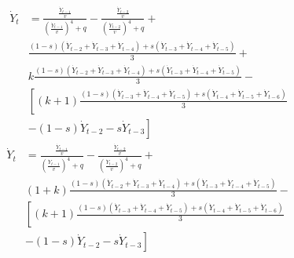 \begin{equation*}
\begin{split}
    \dot Y_{t}& = \frac{\frac{\dot Y_{t-1}}{v}}{\left(\frac{\dot Y_{t-1}}{v}\right)^4+q}-\frac{\frac{\dot Y_{t-2}}{v}}{\left(\frac{\dot Y_{t-2}}{v}\right)^4+q} + \\
    & \frac{(1-s)(\dot Y_{t-2}+\dot Y_{t-3}+\dot Y_{t-4})+s(\dot Y_{t-3}+\dot Y_{t-4}+\dot Y_{t-5})}{3} + \\
    &k\frac{(1-s)(\dot Y_{t-2}+\dot Y_{t-3}+\dot Y_{t-4})+s(\dot Y_{t-3}+\dot Y_{t-4}+\dot Y_{t-5})}{3}-\\
    &\left[(k+1)\frac{(1-s)(\dot Y_{t-3}+\dot Y_{t-4}+\dot Y_{t-5})+s(\dot Y_{t-4}+\dot Y_{t-5}+\dot Y_{t-6})}{3}\right.\\
    &\left.-(1-s)\dot Y_{t-2}-s\dot Y_{t-3}\right]
\end{split}
\end{equation*}
\begin{equation}
\begin{split}
    \dot Y_{t}& = \frac{\frac{\dot Y_{t-1}}{v}}{\left(\frac{\dot Y_{t-1}}{v}\right)^4+q}-\frac{\frac{\dot Y_{t-2}}{v}}{\left(\frac{\dot Y_{t-2}}{v}\right)^4+q} + \\
    & (1+k)\frac{(1-s)(\dot Y_{t-2}+\dot Y_{t-3}+\dot Y_{t-4})+s(\dot Y_{t-3}+\dot Y_{t-4}+\dot Y_{t-5})}{3} -\\
    &\left[(k+1)\frac{(1-s)(\dot Y_{t-3}+\dot Y_{t-4}+\dot Y_{t-5})+s(\dot Y_{t-4}+\dot Y_{t-5}+\dot Y_{t-6})}{3}\right.\\
    &\left.-(1-s)\dot Y_{t-2}-s\dot Y_{t-3}\right]
\end{split}
\end{equation}
